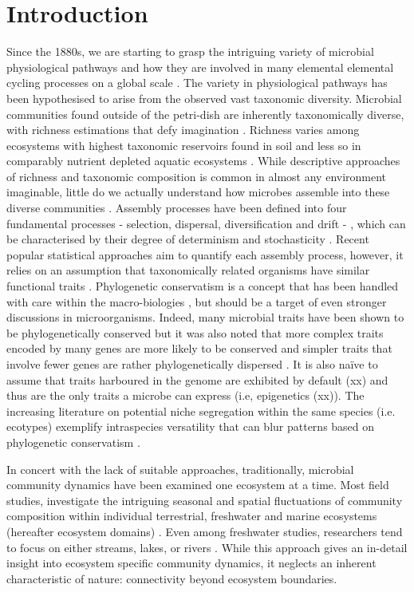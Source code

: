 \documentclass[12pt,a4paper]{article} %
\begin{document}
\section*{Introduction}
Since the 1880s, we are starting to grasp the intriguing variety of microbial physiological pathways and how they are involved in many elemental elemental cycling processes on a global scale \citep{Caumette2015}. The variety in physiological pathways has been hypothesised to arise from the observed vast taxonomic diversity. Microbial communities found outside of the petri-dish are inherently taxonomically diverse, with richness estimations that defy imagination \citep{Thompson2017, Louca2019}. Richness varies among ecosystems with highest taxonomic reservoirs found in soil and less so in comparably nutrient depleted aquatic ecosystems \citep{Thompson2017}. While descriptive approaches of richness and taxonomic composition is common in almost any environment imaginable, little do we actually understand how microbes assemble into these diverse communities \citep{Shade2017a, Shade2018}. Assembly processes have been defined into four fundamental processes - selection, dispersal, diversification and drift - \citep{Vellend2010}, which can be characterised by their degree of determinism and stochasticity \citep{Zhou2017}. Recent popular statistical approaches aim to quantify each assembly process, however, it relies on an assumption that taxonomically related organisms have similar functional traits \citep{Stegen2013a, Stegen2015a}. Phylogenetic conservatism is a concept that has been handled with care within the macro-biologies \citep{Losos2008, Warren2008}, but should be a target of even stronger discussions in microorganisms. Indeed, many microbial traits have been shown to be phylogenetically conserved \citep{Martiny2015} but it was also noted that more complex traits encoded by many genes are more likely to be conserved and simpler traits that involve fewer genes are rather phylogenetically dispersed \citep{Martiny2013a}. It is also na\"{i}ve to assume that traits harboured in the genome are exhibited by default (xx) and thus are the only traits a microbe can express (i.e,  epigenetics (xx)). The increasing literature on potential niche segregation within the same species (i.e. ecotypes) exemplify intraspecies versatility that can blur patterns based on phylogenetic conservatism \citep{Achtman2008, Ackermann2015, Chase2018}.

In concert with the lack of suitable approaches, traditionally, microbial community dynamics have been examined one ecosystem at a time. Most field studies, investigate the intriguing seasonal and spatial fluctuations of community composition within individual terrestrial, freshwater and marine ecosystems (hereafter ecosystem domains) \citep{Shigyo2019,Jones2012,Hassell2018,Giovannoni2012}. Even among freshwater studies, researchers tend to focus on either streams, lakes, or rivers \citep{Logue2008}. While this approach gives an in-detail insight into ecosystem specific community dynamics, it neglects an inherent characteristic of nature: connectivity beyond ecosystem boundaries.
\end{document}
